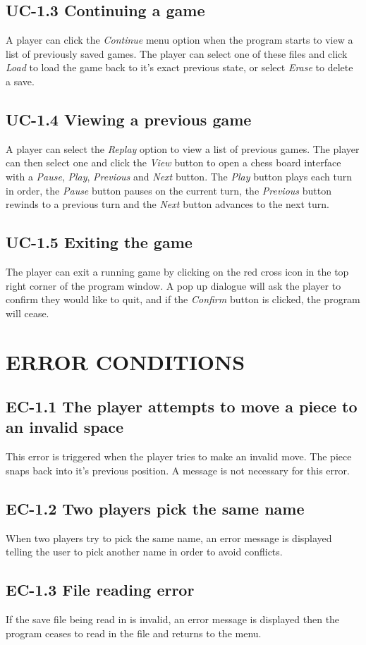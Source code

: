 \documentclass{project}
\begin{document}
\subsection{UC-1.3 Continuing a game}
A player can click the \emph{Continue} menu option when the program starts to view a list of previously saved games. The player can select one of these files and click \emph{Load} to load the game back to it's exact previous state, or select \emph{Erase} to delete a save.
\subsection{UC-1.4 Viewing a previous game}
A player can select the \emph{Replay} option to view a list of previous games. The player can then select one and click the \emph{View} button to open a chess board interface with a \emph{Pause}, \emph{Play}, \emph{Previous} and \emph{Next} button. The \emph{Play} button plays each turn in order, the \emph{Pause} button pauses on the current turn, the \emph{Previous} button rewinds to a previous turn and the \emph{Next} button advances to the next turn.
\subsection{UC-1.5 Exiting the game}
The player can exit a running game by clicking on the red cross icon in the top right corner of the program window. A pop up dialogue will ask the player to confirm they would like to quit, and if the \emph{Confirm} button is clicked, the program will cease.
\section{ERROR CONDITIONS}
\subsection{EC-1.1 The player attempts to move a piece to an invalid space}
This error is triggered when the player tries to make an invalid move. The piece snaps back into it's previous position. A message is not necessary for this error.
\subsection{EC-1.2 Two players pick the same name}
When two players try to pick the same name, an error message is displayed telling the user to pick another name in order to avoid conflicts.
\subsection{EC-1.3 File reading error}
If the save file being read in is invalid, an error message is displayed then the program ceases to read in the file and returns to the menu.
\end{document}
